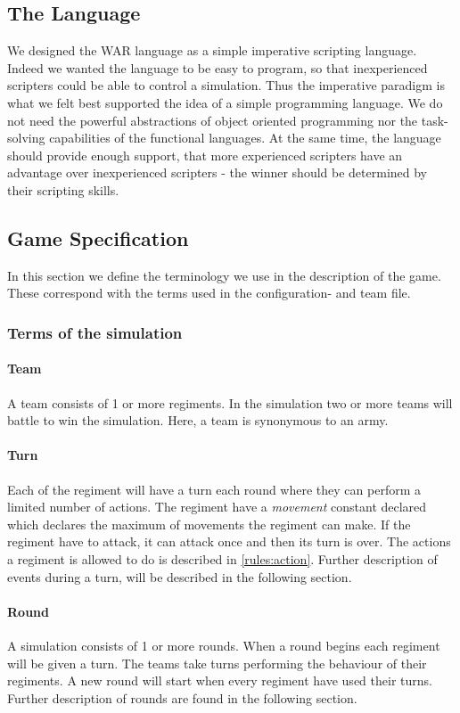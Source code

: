 	\subsection{The Language}
		We designed the WAR language as a simple imperative scripting language.	Indeed we wanted the language to be easy to program, so that inexperienced scripters could be able to control a simulation. Thus the imperative paradigm is what we felt best supported the idea of a simple programming language. We do not need the powerful abstractions of object oriented programming nor the task-solving capabilities of the functional languages. At the same time, the language should provide enough support, that more experienced scripters have an advantage over inexperienced scripters - the winner should be determined by their scripting skills. 
	\subsection{Game Specification}
	In this section we define the terminology we use in the description of the game.
	These correspond with the terms used in the configuration- and team file.
	
		\subsubsection{Terms of the simulation}
		
		\paragraph{Team}		
		A team consists of 1 or more regiments. In the simulation two or more teams will battle to win the simulation. Here, a team is synonymous to an army.
		
		\paragraph{Turn}
		Each of the regiment will have a turn each round where they can perform a limited number of actions.
		The regiment have a \textit{movement} constant declared which declares the maximum of movements the regiment can make.
		If the regiment have to attack, it can attack once and then its turn is over. 
		The actions a regiment is allowed to do is described in \ref{rules:action}.
		Further description of events during a turn, will be described in the following section.
		
		\paragraph{Round}
		A simulation consists of 1 or more rounds. When a round begins each regiment will be given a turn.
		The teams take turns performing the behaviour of their regiments. 
		A new round will start when every regiment have used their turns.
		Further description of rounds are found in the following section.

